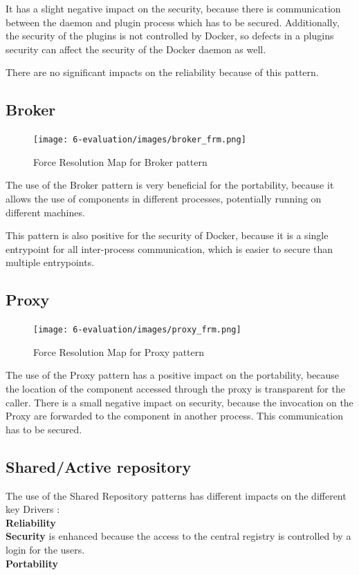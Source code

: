 It has a slight negative impact on the security, because there is communication between the daemon and plugin process which has to be secured. Additionally, the security of the plugins is not controlled by Docker, so defects in a plugins security can affect the security of the Docker daemon as well. 

There are no significant impacts on the reliability because of this pattern.

\subsection{Broker}
\begin{figure}[H]
\centering
\texttt{[image: 6-evaluation/images/broker\_frm.png]}
\caption{Force Resolution Map for Broker pattern}
\label{fig:broker-frm}
\end{figure}
The use of the Broker pattern is very beneficial for the portability, because it allows the use of components in different processes, potentially running on different machines.

This pattern is also positive for the security of Docker, because it is a single entrypoint for all inter-process communication, which is easier to secure than multiple entrypoints.


\subsection{Proxy}
\begin{figure}[H]
\centering
\texttt{[image: 6-evaluation/images/proxy\_frm.png]}
\caption{Force Resolution Map for Proxy pattern}
\label{fig:proxy-frm}
\end{figure}
The use of the Proxy pattern has a positive impact on the portability, because the location of the component accessed through the proxy is transparent for the caller.
There is a small negative impact on security, because the invocation on the Proxy are forwarded to the component in another process. This communication has to be secured.


\subsection{Shared/Active repository} 
The use of the Shared Repository patterns has different impacts on the different key Drivers : \\ 
\textbf{Reliability} \\
\textbf{Security} is enhanced because the access to the central registry is controlled by a login for the users. \\
\textbf{Portability} \\

